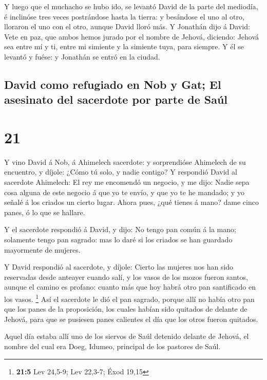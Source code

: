  Y luego que el muchacho se hubo ido, se levantó David de
la parte del mediodía, é inclinóse tres veces postrándose hasta la
tierra: y besándose el uno al otro, lloraron el uno con el otro, aunque
David lloró más.  Y Jonathán dijo á David: Vete en paz,
que ambos hemos jurado por el nombre de Jehová, diciendo: Jehová sea
entre mí y ti, entre mi simiente y la simiente tuya, para siempre. Y él
se levantó y fuése: y Jonathán se entró en la ciudad.

\hypertarget{david-como-refugiado-en-nob-y-gat-el-asesinato-del-sacerdote-por-parte-de-sauxfal}{%
\subsection{David como refugiado en Nob y Gat; El asesinato del
sacerdote por parte de
Saúl}\label{david-como-refugiado-en-nob-y-gat-el-asesinato-del-sacerdote-por-parte-de-sauxfal}}

\hypertarget{section-20}{%
\section{21}\label{section-20}}

 Y vino David á Nob, á Ahimelech sacerdote: y sorprendióse
Ahimelech de su encuentro, y díjole: ¿Cómo tú solo, y nadie contigo?
 Y respondió David al sacerdote Ahimelech: El rey me
encomendó un negocio, y me dijo: Nadie sepa cosa alguna de este negocio
á que yo te envío, y que yo te he mandado; y yo señalé á los criados un
cierto lugar.  Ahora pues, ¿qué tienes á mano? dame cinco
panes, ó lo que se hallare.

 Y el sacerdote respondió á David, y dijo: No tengo pan
común á la mano; solamente tengo pan sagrado: mas lo daré si los criados
se han guardado mayormente de mujeres.

 Y David respondió al sacerdote, y díjole: Cierto las
mujeres nos han sido reservadas desde anteayer cuando salí, y los vasos
de los mozos fueron santos, aunque el camino es profano: cuanto más que
hoy habrá otro pan santificado en los vasos. \footnote{\textbf{21:5} Lev
  24,5-9; Lev 22,3-7; Éxod 19,15}  Así el sacerdote le dió
el pan sagrado, porque allí no había otro pan que los panes de la
proposición, los cuales habían sido quitados de delante de Jehová, para
que se pusiesen panes calientes el día que los otros fueron quitados.

 Aquel día estaba allí uno de los siervos de Saúl detenido
delante de Jehová, el nombre del cual era Doeg, Idumeo, principal de los
pastores de Saúl.

